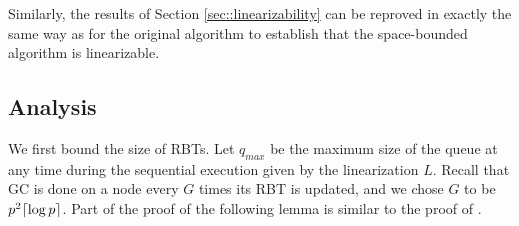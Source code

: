 Similarly, the results of Section \ref{sec::linearizability} 
can be reproved in exactly the same way as for the original algorithm to establish
that the space-bounded algorithm is linearizable.

\subsection{Analysis}
\label{sec::GCanalysis}


We first bound the size of RBTs.  Let $q_{max}$ be the maximum size of the queue at any time during the sequential execution given by the linearization $L$.
Recall that GC is done on a node every $G$ times its RBT is updated, and we chose $G$ to be $p^2\lceil \log p \rceil$.
Part of the proof of the following lemma is similar to the proof of .

